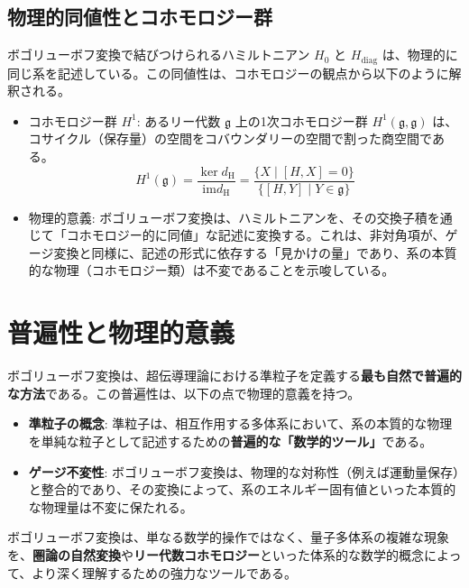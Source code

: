 \documentclass[uplatex,a4j,12pt,dvipdfmx]{jsarticle}
\begin{document}
\subsection{物理的同値性とコホモロジー群}

ボゴリューボフ変換で結びつけられるハミルトニアン $H_{\text{0}}$ と $H_{\text{diag}}$ は、物理的に同じ系を記述している。この同値性は、コホモロジーの観点から以下のように解釈される。

\begin{itemize}
	\item コホモロジー群 $H^1$: あるリー代数 $\mathfrak{g}$ 上の1次コホモロジー群 $H^1(\mathfrak{g}, \mathfrak{g})$ は、コサイクル（保存量）の空間をコバウンダリーの空間で割った商空間である。
	      \[
		      H^1(\mathfrak{g}) = \frac{\ker d_{\text{H}}}{\mathrm{im} d_{\text{H}}} = \frac{\{X \mid [H, X] = 0\}}{\{[H, Y] \mid Y \in \mathfrak{g}\}}
	      \]
	\item 物理的意義: ボゴリューボフ変換は、ハミルトニアンを、その交換子積を通じて「コホモロジー的に同値」な記述に変換する。これは、非対角項が、ゲージ変換と同様に、記述の形式に依存する「見かけの量」であり、系の本質的な物理（コホモロジー類）は不変であることを示唆している。
\end{itemize}

\section{普遍性と物理的意義}

ボゴリューボフ変換は、超伝導理論における準粒子を定義する\textbf{最も自然で普遍的な方法}である。この普遍性は、以下の点で物理的意義を持つ。

\begin{itemize}
	\item \textbf{準粒子の概念}: 準粒子は、相互作用する多体系において、系の本質的な物理を単純な粒子として記述するための\textbf{普遍的な「数学的ツール」}である。
	\item \textbf{ゲージ不変性}: ボゴリューボフ変換は、物理的な対称性（例えば運動量保存）と整合的であり、その変換によって、系のエネルギー固有値といった本質的な物理量は不変に保たれる。
\end{itemize}
ボゴリューボフ変換は、単なる数学的操作ではなく、量子多体系の複雑な現象を、\textbf{圏論の自然変換}や\textbf{リー代数コホモロジー}といった体系的な数学的概念によって、より深く理解するための強力なツールである。
\end{document}
